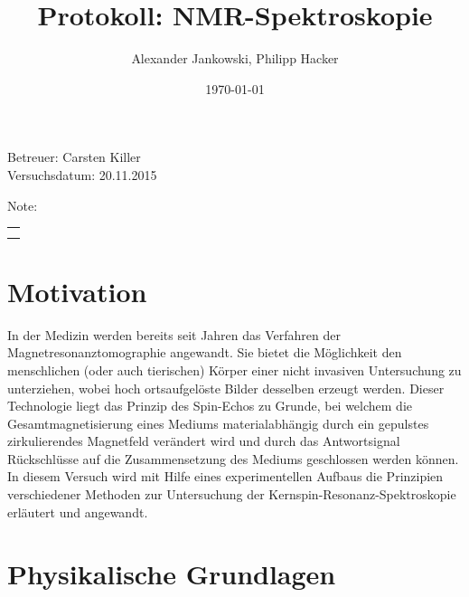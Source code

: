 \documentclass[numbers=noenddot,a4paper,notitlepage,twoside,BCOR15mm]{scrartcl}
\title{Protokoll: NMR-Spektroskopie} %
\author{Alexander Jankowski, Philipp Hacker}
\date{\today}
\begin{document}
	\maketitle
	\begin{center}
		Betreuer: Carsten Killer\\ %
		Versuchsdatum: 20.11.2015 \\ %
		\begin{table}[h]
			\centering
			Note: %
			\begin{tabularx}{1.5cm}{|X|}
				\hline \\ \\
				\hline
			\end{tabularx}
		\end{table}
	\end{center}
	\vspace*{\fill}
	\tableofcontents
	\vfill
	\newpage
	\section{Motivation}
	
	In der Medizin werden bereits seit Jahren das Verfahren der Magnetresonanztomographie angewandt. Sie bietet die Möglichkeit den menschlichen (oder auch tierischen) Körper einer nicht invasiven Untersuchung zu unterziehen, wobei hoch ortsaufgelöste Bilder desselben erzeugt werden. Dieser Technologie liegt das Prinzip des Spin-Echos zu Grunde, bei welchem die Gesamtmagnetisierung eines Mediums materialabhängig durch ein gepulstes zirkulierendes Magnetfeld verändert wird und durch das Antwortsignal Rückschlüsse auf die Zusammensetzung des Mediums geschlossen werden können. In diesem Versuch wird mit Hilfe eines experimentellen Aufbaus die Prinzipien verschiedener Methoden zur Untersuchung der Kernspin-Resonanz-Spektroskopie erläutert und angewandt.
	
	\newpage
	\section{Physikalische Grundlagen}
\end{document}
